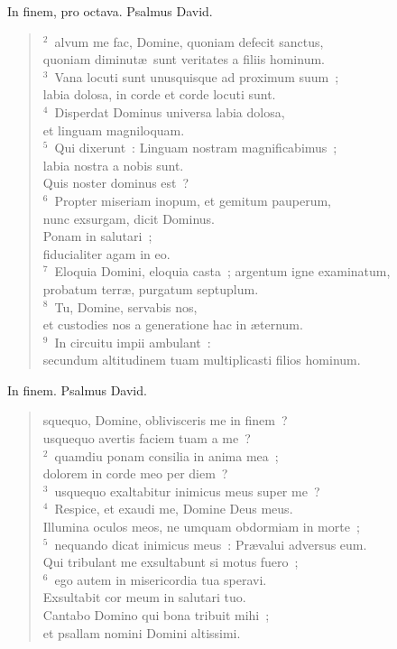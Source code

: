\bchapter[Psalm]
In finem, pro octava. Psalmus David.
\begin{verse}${}^{2}$~alvum me fac, Domine, quoniam defecit sanctus,\\ quoniam diminut\ae\ sunt veritates a filiis hominum.\\
${}^{3}$~Vana locuti sunt unusquisque ad proximum suum~;\\ labia dolosa, in corde et corde locuti sunt.\\
${}^{4}$~Disperdat Dominus universa labia dolosa,\\ et linguam magniloquam.\\
${}^{5}$~Qui dixerunt~: Linguam nostram magnificabimus~;\\ labia nostra a nobis sunt.\\ Quis noster dominus est~?\\
${}^{6}$~Propter miseriam inopum, et gemitum pauperum,\\ nunc exsurgam, dicit Dominus.\\ Ponam in salutari~;\\ fiducialiter agam in eo.\\
${}^{7}$~Eloquia Domini, eloquia casta~; argentum igne examinatum,\\ probatum terr\ae , purgatum septuplum.\\
${}^{8}$~Tu, Domine, servabis nos,\\ et custodies nos a generatione hac in \ae ternum.\\
${}^{9}$~In circuitu impii ambulant~:\\ secundum altitudinem tuam multiplicasti filios hominum.\end{verse}



\bchapter[Psalm]
In finem. Psalmus David. \begin{verse}squequo, Domine, oblivisceris me in finem~?\\ usquequo avertis faciem tuam a me~?\\
${}^{2}$~quamdiu ponam consilia in anima mea~;\\ dolorem in corde meo per diem~?\\
${}^{3}$~usquequo exaltabitur inimicus meus super me~?\\
${}^{4}$~Respice, et exaudi me, Domine Deus meus.\\ Illumina oculos meos, ne umquam obdormiam in morte~;\\
${}^{5}$~nequando dicat inimicus meus~: Pr\ae valui adversus eum.\\ Qui tribulant me exsultabunt si motus fuero~;\\
${}^{6}$~ego autem in misericordia tua speravi.\\ Exsultabit cor meum in salutari tuo.\\ Cantabo Domino qui bona tribuit mihi~;\\ et psallam nomini Domini altissimi.\end{verse}



